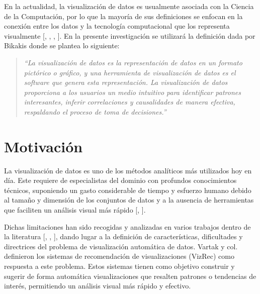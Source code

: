 En la actualidad, la visualizaci\'on de datos
es usualmente asociada con la Ciencia de la Computaci\'on, por lo que la mayor\'ia
de sus definiciones se enfocan en la conexi\'on entre los datos y la tecnolog\'ia
computacional que los representa visualmente 
[\cite*{card1999readings}, \cite*{friendly2001milestones}, \cite*{manovich2010visualization}, \cite*{kirk2012data}].
En la presente investigaci\'on se utilizar\'a la definici\'on dada por
Bikakis \cite{bikakis2018big} donde se plantea lo siguiente:\\
\begin{quotation}
    \textit{``La visualizaci\'on de datos es la representación de datos en un
    formato pictórico o gráfico, y una herramienta de visualización de
    datos es el software que genera esta representación. La visualización
    de datos proporciona a los usuarios un medio intuitivo para identificar patrones
    interesantes, inferir correlaciones y causalidades de manera efectiva,
    respaldando el proceso de toma de decisiones.''}
\end{quotation}


\section*{Motivaci\'on}


La visualizaci\'on de datos es uno de los m\'etodos
anal\'iticos m\'as utilizados hoy en d\'ia. Este requiere de especialistas
del dominio con profundos conocimientos t\'ecnicos, suponiendo un gasto
considerable de tiempo y esfuerzo humano debido al tama\~no y dimensi\'on
de los conjuntos de datos y a la ausencia de herramientas que faciliten un
an\'alisis visual m\'as r\'apido [\cite*{chen2012business}, \cite*{vartak2017towards}].

Dichas limitaciones han sido recogidas y analizadas en varios trabajos dentro de la
literatura [\cite*{vartak2017towards}, \cite*{zeng2021we}, \cite*{godfrey2016interactive}], 
dando lugar a la definici\'on de caracter\'isticas, dificultades y 
directrices del problema de visualizaci\'on autom\'atica de datos.
Vartak y col. \cite{vartak2017towards} definieron los sistemas de recomendaci\'on
de visualizaciones (VizRec) como respuesta a este problema. Estos sistemas tienen como
objetivo construir y sugerir de forma autom\'atica visualizaciones que resalten
patrones o tendencias de inter\'es, permitiendo un an\'alisis visual m\'as r\'apido
y efectivo.

